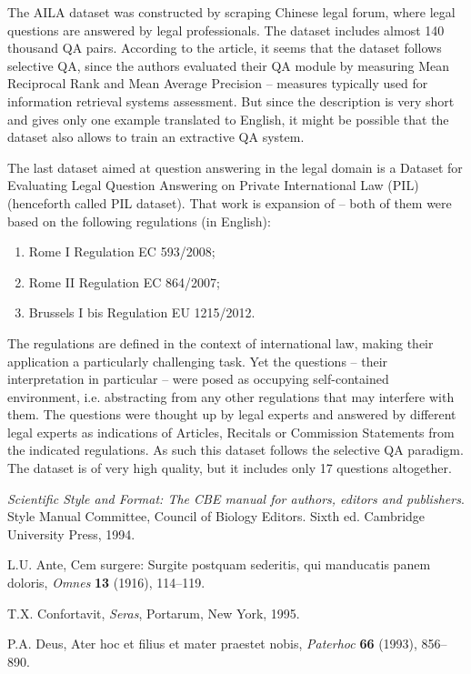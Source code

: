 \documentclass{IOS-Book-Article}
\begin{document}
The AILA dataset \cite{weiyi2020aila} was constructed by scraping Chinese legal forum, where legal questions are answered by legal professionals. The dataset includes almost 140 thousand QA pairs. According to the article, it seems that the dataset follows selective QA, since the authors evaluated their QA module by measuring Mean Reciprocal Rank and Mean Average Precision -- measures typically used for information retrieval systems assessment. But since the description is very short and gives only one example translated to English, it might be possible that the dataset also allows to train an
extractive QA system.

The last dataset aimed at question answering in the legal domain is a Dataset for Evaluating Legal Question Answering on Private International Law (PIL) \cite{sovrano2021dataset} (henceforth called PIL dataset). That work is expansion of \cite{sovrano2020legal} -- both of them were based on the following regulations (in English): 
\begin{enumerate}
  \item Rome I Regulation EC 593/2008;
  \item  Rome II Regulation EC 864/2007;
  \item Brussels I bis Regulation EU 1215/2012.
\end{enumerate}
The regulations are defined in the context of international law, making their application a particularly challenging task. Yet the questions -- their interpretation in particular -- were posed as occupying self-contained environment, i.e. abstracting from any other regulations that may interfere with them. The questions were thought up by legal experts and answered by different legal experts as indications of Articles, Recitals or Commission Statements from the indicated
regulations. As such this dataset follows the selective QA paradigm. The dataset is of very high quality, but it includes only 17 questions altogether.


\begin{thebibliography}{99}

\textit{Scientific Style and Format: The CBE manual for authors,
editors and publishers}. Style Manual Committee, Council of Biology Editors.
Sixth ed. Cambridge University Press, 1994.

L.U. Ante, Cem surgere: Surgite postquam sederitis, qui manducatis panem doloris,
\textit{Omnes} \textbf{13} (1916), 114--119.

T.X. Confortavit, \textit{Seras}, Portarum, New York, 1995.

P.A. Deus, Ater hoc et filius et mater praestet nobis,
\textit{Paterhoc} \textbf{66} (1993), 856--890.

\end{thebibliography}
\end{document}
